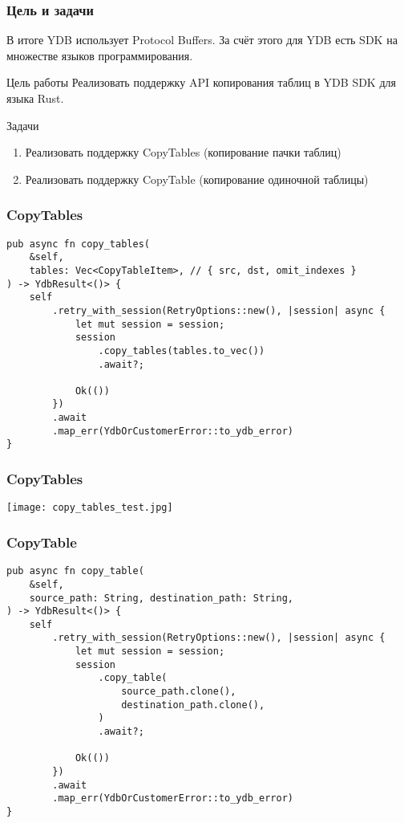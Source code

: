 \begin{frame}\frametitle{Цель и задачи}
    \begin{block}{В итоге}
        YDB использует Protocol Buffers. За счёт этого для YDB есть SDK на множестве языков программирования.
    \end{block}

    \begin{block}{Цель работы}
        Реализовать поддержку API копирования таблиц в YDB SDK для языка Rust.
    \end{block}

    \begin{block}{Задачи}
        \begin{enumerate}
            \item Реализовать поддержку CopyTables (копирование пачки таблиц)
            \item Реализовать поддержку CopyTable (копирование одиночной таблицы)
        \end{enumerate}
    \end{block}
\end{frame}

\begin{frame}[fragile]\frametitle{CopyTables}
    \begin{lstlisting}
pub async fn copy_tables(
    &self,
    tables: Vec<CopyTableItem>, // { src, dst, omit_indexes }
) -> YdbResult<()> {
    self
        .retry_with_session(RetryOptions::new(), |session| async {
            let mut session = session;
            session
                .copy_tables(tables.to_vec())
                .await?;

            Ok(())
        })
        .await
        .map_err(YdbOrCustomerError::to_ydb_error)
}
    \end{lstlisting}
\end{frame}

\begin{frame}\frametitle{CopyTables}
    \texttt{[image: copy\_tables\_test.jpg]}
\end{frame}

\begin{frame}[fragile]\frametitle{CopyTable}
    \begin{lstlisting}
pub async fn copy_table(
    &self,
    source_path: String, destination_path: String,
) -> YdbResult<()> {
    self
        .retry_with_session(RetryOptions::new(), |session| async {
            let mut session = session;
            session
                .copy_table(
                    source_path.clone(),
                    destination_path.clone(),
                )
                .await?;

            Ok(())
        })
        .await
        .map_err(YdbOrCustomerError::to_ydb_error)
}
    \end{lstlisting}
\end{frame}

